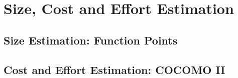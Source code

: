 \section{Size, Cost and Effort Estimation}

\subsection{Size Estimation: Function Points}

\subsection{Cost and Effort Estimation: COCOMO II}
